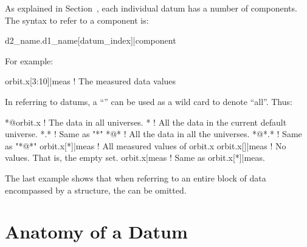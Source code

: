 As explained in Section~, each individual datum
has a number of components. The syntax to refer to a component is:
\begin{example}
  d2_name.d1_name[datum_index]|component
\end{example}
For example:
\begin{example}
  orbit.x[3:10]|meas     ! The measured data values
\end{example}

In referring to datums, a ``\vn{*}'' can be used as a wild card to 
denote ``all''. Thus:
\begin{example}
  *@orbit.x       ! The  data in all universes.
  *               ! All the data in the current default universe.
  *.*             ! Same as "*"
  *@*             ! All the data in all the universes. 
  *@*.*           ! Same as "*@*"
  orbit.x[*]|meas ! All measured values of orbit.x
  orbit.x[]|meas  ! No values. That is, the empty set.
  orbit.x|meas    ! Same as orbit.x[*]|meas.
\end{example}
The last example shows that when referring to an entire block of data
encompassed by a  structure, the \vn{[*]} can be omitted.

\section{Anatomy of a Datum}
\label{s:data.anatomy}

